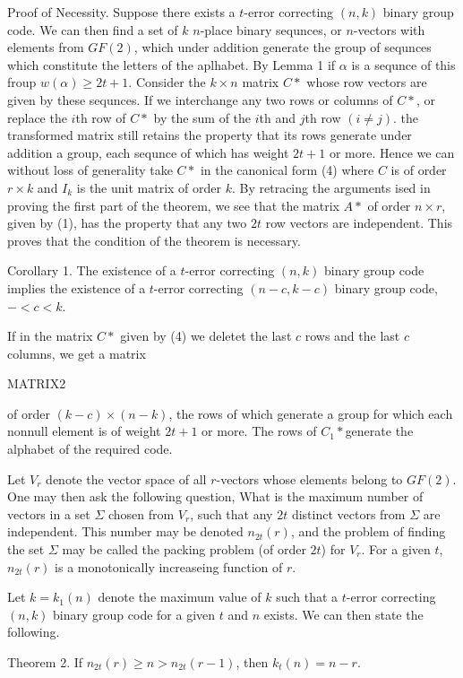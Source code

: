 \documentclass{article}
\begin{document}
Proof of Necessity. Suppose there exists a $t$-error correcting $(n,k)$ binary group code. We can then find a set of $k$ $n$-place binary sequnces, or $n$-vectors with elements  from $GF(2)$, which under addition generate the group of sequnces which constitute the letters of the aplhabet. By Lemma 1 if $\alpha$ is a sequnce of this froup $w(\alpha)\geq 2t+1$. Consider the $k\times n$ matrix $C*$ whose row vectors are given by these sequnces. If we interchange any two rows or columns of $C*$, or replace the $i$th row of $C*$ by the sum of the $i$th and $j$th row $(i\neq j)$. the transformed matrix still retains the property that its rows generate under addition a group, each sequnce of which has weight $2t+1$ or more. Hence we can without loss of generality take $C*$ in the canonical form (4) where $C$ is of order $r\times k$ and $I_k$ is the unit matrix of order $k$. By retracing the arguments ised in proving the first part of the theorem, we see that the matrix $A*$ of order $n\times r$, given by (1), has the property that any two $2t$ row vectors are independent. This proves that the condition of the theorem is necessary.

Corollary 1. The existence of a $t$-error correcting $(n,k)$ binary group code implies the existence of a $t$-error correcting $(n-c,k-c)$ binary group code, $-<c<k$.

If in the matrix $C*$ given by (4) we deletet the last $c$ rows and the last $c$ columns, we get a matrix

MATRIX2

of order $(k-c)\times (n-k)$, the rows of which generate a group for which each nonnull element is of weight $2t+1$ or more. The rows of $C_1*$generate the alphabet of the required code.

Let $V_r$ denote the vector space of all $r$-vectors whose elements belong to $GF(2)$. One may then ask the following question, What is the maximum number of vectors in a set $\Sigma$ chosen from $V_r$, such that any $2t$ distinct vectors from $\Sigma$ are independent. This number may be denoted $n_{2t}(r)$, and the problem of finding the set $\Sigma$ may be called the packing problem (of order $2t$) for $V_r$. For a given $t$, $n_{2t}(r)$ is a monotonically increaseing function of $r$.

Let $k=k_1(n)$ denote the maximum value of $k$ such that a $t$-error correcting $(n,k)$ binary group code for a given $t$ and $n$ exists. We can then state the following.

Theorem 2. If $n_{2t}(r)\geq n>n_{2t}(r-1)$, then $k_t(n)=n-r$.
\end{document}

